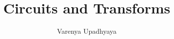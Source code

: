 \documentclass[journal,12pt,twocolumn]{IEEEtran}
\begin{document}
\let\StandardTheFigure\thefigure
\renewcommand{\thefigure}{\theproblem}



\def\putbox#1#2#3{\makebox[0in][l]{\makebox[#1][l]{}\raisebox{\baselineskip}[0in][0in]{\raisebox{#2}[0in][0in]{#3}}}}
     \def\rightbox#1{\makebox[0in][r]{#1}}
     \def\centbox#1{\makebox[0in]{#1}}
     \def\topbox#1{\raisebox{-\baselineskip}[0in][0in]{#1}}
     \def\midbox#1{\raisebox{-0.5\baselineskip}[0in][0in]{#1}}

\vspace{3cm}

\title{ 
Circuits and Transforms
}


%
%
%

\author{ Varenya Upadhyaya %
}
% 
%
\end{document}
